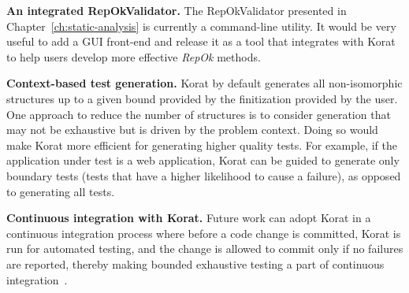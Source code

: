 \para \textbf{An integrated RepOkValidator.} The RepOkValidator
presented in Chapter~\ref{ch:static-analysis} is currently a
command-line utility.  It would be very useful to add a GUI front-end
and release it as a tool that integrates with Korat to help users
develop more effective \emph{RepOk} methods.

\begin{comment}
\para \textbf{Reflection instrumentation.}
Chapter~\ref{ch:adding-reflection} presented our technique that builds
on Korat to support the usage of reflection; however, our current
protoype tool implementation requires manually transforming the calls
to Java reflection API to our own reflection API (which mimics the
Java reflection API but also notifies Korat of field accesses).  An
additional simple engineering step that replaces calls to Java
reflection API to our API is required for fully automatic support of
allowing the use of reflection for field accesses.
\end{comment}

\para \textbf{Context-based test generation.} Korat by default
generates all non-isomorphic structures up to a given bound provided
by the finitization provided by the user. One approach to reduce the
number of structures is to consider generation that may not be
exhaustive but is driven by the problem context. Doing so would make
Korat more efficient for generating higher quality tests. For example,
if the application under test is a web application, Korat can be
guided to generate only boundary tests (tests that have a higher
likelihood to cause a failure), as opposed to generating all tests.

\para \textbf{Continuous integration with Korat.} Future work can
adopt Korat in a continuous integration process where before a code
change is committed, Korat is run for automated testing, and the
change is allowed to commit only if no failures are reported, thereby
making bounded exhaustive testing a part of continuous
integration~\cite{fowler2006continuous}.
